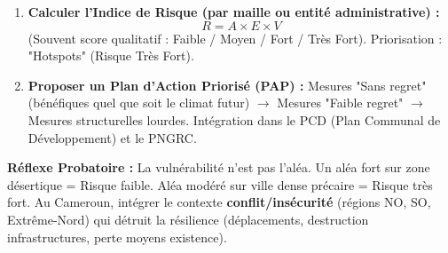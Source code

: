 \documentclass[11pt]{article}
\begin{document}
\begin{methode}
\begin{enumerate}
\begin{itemize}
                  \item \textbf{Économique :} Assurance, épargne, diversification revenus, accès crédit.
                  \item \textbf{Institutionnelle :} Existence PCS, PCDR (Plan Communal Développement Rural), budget risque, personnel formé, coordination intercommunale.
              \end{itemize}
        \item \textbf{Calculer l'Indice de Risque (par maille ou entité administrative) :}
              \[ R = A \times E \times V \]
              (Souvent score qualitatif : Faible / Moyen / Fort / Très Fort). Priorisation : "Hotspots" (Risque Très Fort).
        \item \textbf{Proposer un Plan d'Action Priorisé (PAP) :} Mesures "Sans regret" (bénéfiques quel que soit le climat futur) $\rightarrow$ Mesures "Faible regret" $\rightarrow$ Mesures structurelles lourdes. Intégration dans le PCD (Plan Communal de Développement) et le PNGRC.
    \end{enumerate}
    \textbf{Réflexe Probatoire :} La vulnérabilité n'est pas l'aléa. Un aléa fort sur zone désertique = Risque faible. Aléa modéré sur ville dense précaire = Risque très fort. Au Cameroun, intégrer le contexte \textbf{conflit/insécurité} (régions NO, SO, Extrême-Nord) qui détruit la résilience (déplacements, destruction infrastructures, perte moyens existence).
\end{methode}
\end{document}

